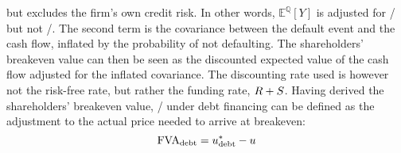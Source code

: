 \documentclass[main.tex]{subfiles}
\begin{document}
            but excludes the firm's own credit risk. 
            In other words, $\mathbb{E}^{\mathbb{Q}}\left[Y\right]$ is adjusted for \CVA/ but not \DVA/.
            The second term is the covariance between the default event and the cash flow,
            inflated by the probability of not defaulting. 
            The shareholders' breakeven value can then be seen as the discounted expected value of the cash flow
            adjusted for the inflated covariance.
            The discounting rate used is however not the risk-free rate, but rather the funding rate, $R+S$.
            Having derived the shareholders' breakeven value, \FVA/ under debt financing
            can be defined as the adjustment to the actual price needed to arrive at breakeven:
                \begin{equation}
                    \FVA/_{\text{debt}} 
                        = u^{\ast}_{\text{debt}} - u
                    \label{eqn:fva-debt-financing}
                \end{equation}
\end{document}
